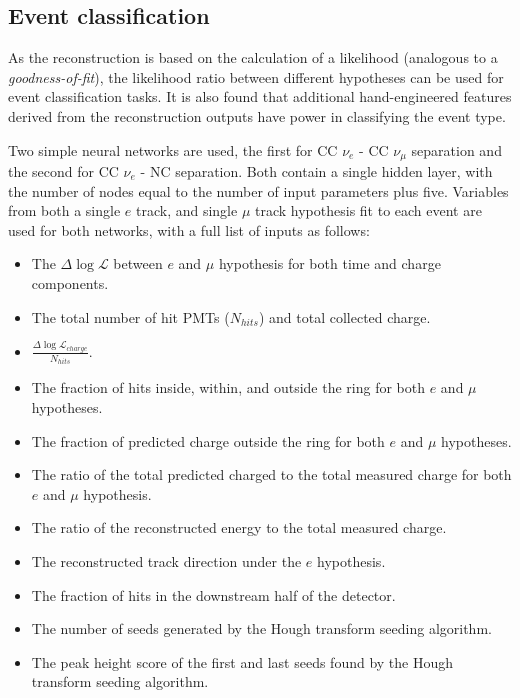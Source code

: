 \subsection{Event classification}%
\label{sec:cvn_old_pid} %

As the reconstruction is based on the calculation of a likelihood (analogous to a
\emph{goodness-of-fit}), the likelihood ratio between different hypotheses can be used for event
classification tasks. It is also found that additional hand-engineered features derived from the
reconstruction outputs have power in classifying the event type.

Two simple neural networks are used, the first for CC $\nu_{e}$ - CC $\nu_{\mu}$ separation and
the second for CC $\nu_{e}$ - NC separation. Both contain a single hidden layer, with the number
of nodes equal to the number of input parameters plus five. Variables from both a single $e$
track, and single $\mu$ track hypothesis fit to each event are used for both networks, with a full
list of inputs as follows:
\begin{itemize}
    \item The $\Delta\log\mathcal{L}$ between $e$ and $\mu$ hypothesis for both time and charge
          components.
    \item The total number of hit PMTs ($N_{hits}$) and total collected charge.
    \item $\frac{\Delta\log\mathcal{L}_{charge}}{N_{hits}}$.
    \item The fraction of hits inside, within, and outside the ring for both $e$ and $\mu$
          hypotheses.
    \item The fraction of predicted charge outside the ring for both $e$ and $\mu$ hypotheses.
    \item The ratio of the total predicted charged to the total measured charge for both $e$
          and $\mu$ hypothesis.
    \item The ratio of the reconstructed energy to the total measured charge.
    \item The reconstructed track direction under the $e$ hypothesis.
    \item The fraction of hits in the downstream half of the detector.
    \item The number of seeds generated by the Hough transform seeding algorithm.
    \item The peak height score of the first and last seeds found by the Hough transform seeding
          algorithm.
\end{itemize}

